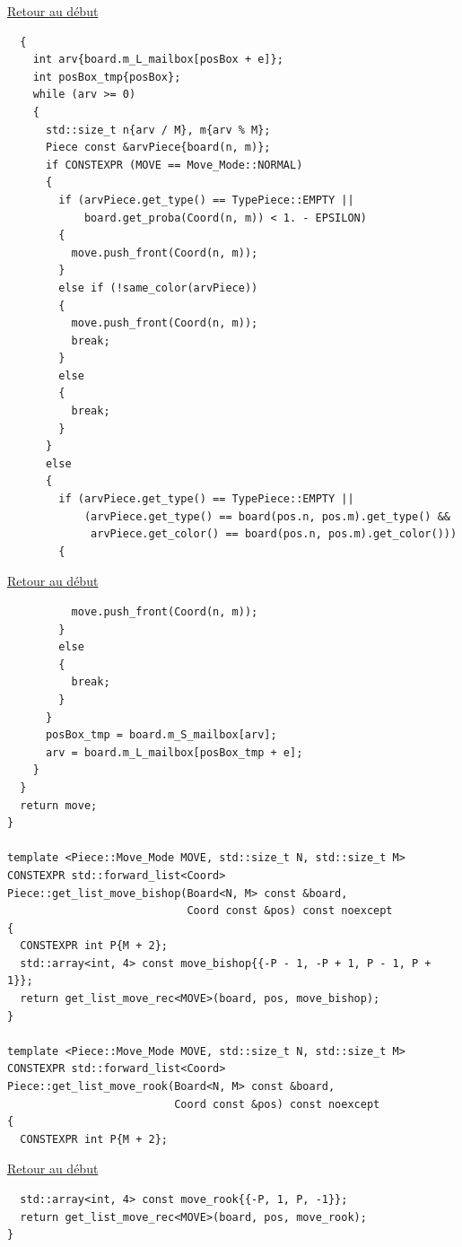 {\begin{frame}[fragile]
\hyperlink{conclusion}{Retour au début}\newline
\begin{verbatim}
  {
    int arv{board.m_L_mailbox[posBox + e]};
    int posBox_tmp{posBox};
    while (arv >= 0)
    {
      std::size_t n{arv / M}, m{arv % M};
      Piece const &arvPiece{board(n, m)};
      if CONSTEXPR (MOVE == Move_Mode::NORMAL)
      {
        if (arvPiece.get_type() == TypePiece::EMPTY ||
            board.get_proba(Coord(n, m)) < 1. - EPSILON)
        {
          move.push_front(Coord(n, m));
        }
        else if (!same_color(arvPiece))
        {
          move.push_front(Coord(n, m));
          break;
        }
        else
        {
          break;
        }
      }
      else
      {
        if (arvPiece.get_type() == TypePiece::EMPTY ||
            (arvPiece.get_type() == board(pos.n, pos.m).get_type() &&
             arvPiece.get_color() == board(pos.n, pos.m).get_color()))
        {
\end{verbatim}
\end{frame}

\begin{frame}[fragile]
\hyperlink{conclusion}{Retour au début}\newline
\begin{verbatim}
          move.push_front(Coord(n, m));
        }
        else
        {
          break;
        }
      }
      posBox_tmp = board.m_S_mailbox[arv];
      arv = board.m_L_mailbox[posBox_tmp + e];
    }
  }
  return move;
}

template <Piece::Move_Mode MOVE, std::size_t N, std::size_t M>
CONSTEXPR std::forward_list<Coord>
Piece::get_list_move_bishop(Board<N, M> const &board,
                            Coord const &pos) const noexcept
{
  CONSTEXPR int P{M + 2};
  std::array<int, 4> const move_bishop{{-P - 1, -P + 1, P - 1, P + 1}};
  return get_list_move_rec<MOVE>(board, pos, move_bishop);
}

template <Piece::Move_Mode MOVE, std::size_t N, std::size_t M>
CONSTEXPR std::forward_list<Coord>
Piece::get_list_move_rook(Board<N, M> const &board,
                          Coord const &pos) const noexcept
{
  CONSTEXPR int P{M + 2};
\end{verbatim}
\end{frame}

\begin{frame}[fragile]
\hyperlink{conclusion}{Retour au début}\newline
\begin{verbatim}
  std::array<int, 4> const move_rook{{-P, 1, P, -1}};
  return get_list_move_rec<MOVE>(board, pos, move_rook);
}


\end{verbatim}
\end{frame}}
